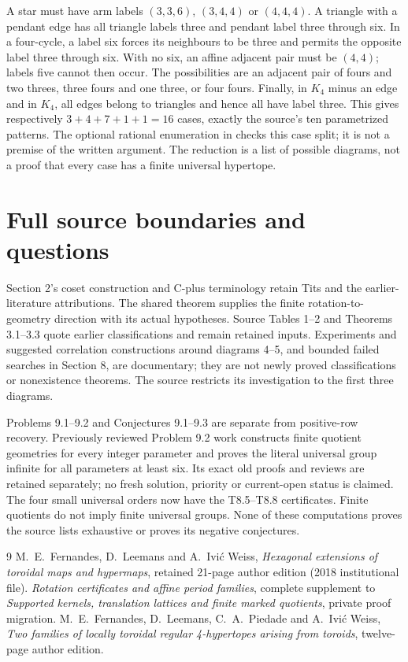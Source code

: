 \documentclass[10pt,a4paper]{article}
\begin{document}
A star must have arm labels $(3,3,6)$, $(3,4,4)$ or $(4,4,4)$.
A triangle with a pendant edge has all triangle labels three and
pendant label three through six. In a four-cycle, a label six forces
its neighbours to be three and permits the opposite label three
through six. With no six, an affine adjacent pair must be $(4,4)$;
labels five cannot then occur. The possibilities are an adjacent pair
of fours and two threes, three fours and one three, or four fours.
Finally, in $K_4$ minus an edge and in $K_4$, all edges belong to
triangles and hence all have label three. This gives respectively
$3+4+7+1+1=16$ cases, exactly the source's ten parametrized patterns.
The optional rational enumeration in  checks
this case split; it is not a premise of the written argument.
The reduction is a list of possible diagrams, not a proof that every
case has a finite universal hypertope.

\section{Full source boundaries and questions}
Section 2's coset construction and C-plus terminology retain Tits and
the earlier-literature attributions. The shared theorem supplies the
finite rotation-to-geometry direction with its actual hypotheses.
Source Tables 1--2 and Theorems 3.1--3.3 quote earlier classifications
and remain retained inputs. Experiments and suggested correlation
constructions around diagrams 4--5, and bounded failed searches in
Section 8, are documentary; they are not newly proved classifications
or nonexistence theorems. The source restricts its investigation to
the first three diagrams.

Problems 9.1--9.2 and Conjectures 9.1--9.3 are separate from positive-row
recovery. Previously reviewed Problem 9.2 work constructs finite
quotient geometries for every integer parameter and proves the literal
universal group infinite for all parameters at least six. Its exact
old proofs and reviews are retained separately; no fresh solution,
priority or current-open status is claimed. The four small universal
orders now have the T8.5--T8.8 certificates. Finite quotients do not
imply finite universal groups. None of these computations proves the
source lists exhaustive or proves its negative conjectures.

\begin{thebibliography}{9}
 M.~E.~Fernandes, D.~Leemans and A.~Ivi\'c Weiss,
\emph{Hexagonal extensions of toroidal maps and hypermaps}, retained
21-page author edition (2018 institutional file).
 \emph{Rotation certificates and affine period families},
complete supplement to \emph{Supported kernels, translation lattices
and finite marked quotients}, private proof migration.
 M.~E.~Fernandes, D.~Leemans, C.~A.~Piedade and
A.~Ivi\'c Weiss, \emph{Two families of locally toroidal regular
4-hypertopes arising from toroids}, twelve-page author edition.
\end{thebibliography}
\end{document}
